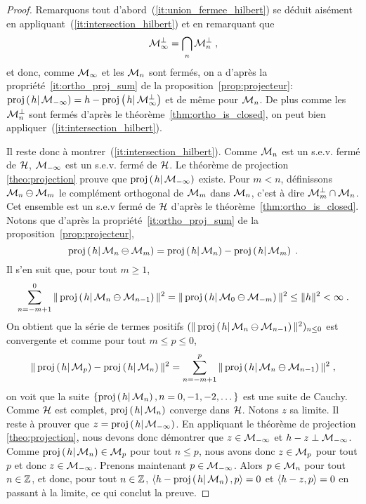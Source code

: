\begin{proof}\smartqed
Remarquons tout d'abord~(\ref{it:union_fermee_hilbert}) se d\'{e}duit ais\'{e}ment en
appliquant~(\ref{it:intersection_hilbert}) et en remarquant que
$$
\mathcal{M}_\infty^\perp= \bigcap_n \mathcal{M}_n^\perp\;,
$$
et donc, comme $\mathcal{M}_\infty$ et les $\mathcal{M}_n$ sont ferm\'{e}s, on a d'apr\`{e}s la
propri\'{e}t\'{e}~\ref{it:ortho_proj_sum} de la proposition~\ref{prop:projecteur}:
$\proj{h}{\cM_{-\infty}}=h-\proj{h}{\cM_\infty^\perp}$
et de m\^{e}me pour  $\mathcal{M}_n$. De plus comme les $\mathcal{M}_n^\perp$ sont ferm\'{e}s d'apr\`{e}s
le th\'{e}or\`{e}me~\ref{thm:ortho_is_closed}, on peut bien
appliquer~(\ref{it:intersection_hilbert}).

Il reste donc \`{a} montrer~(\ref{it:intersection_hilbert}).
Comme $\mathcal{M}_n$ est un s.e.v. ferm\'{e} de $\mathcal{H}$, $\mathcal{M}_{-\infty}$ est un s.e.v. ferm\'{e}
de $\mathcal{H}$. Le th\'{e}or\`{e}me de projection \ref{theo:projection} prouve que
$\proj{h}{\cM_{- \infty}}$ existe. Pour $m < n$, d\'{e}finissons $\mathcal{M}_n \ominus
\mathcal{M}_m$ le compl\'{e}ment orthogonal de $\mathcal{M}_m$ dans $\mathcal{M}_n$, c'est \`{a} dire
$\mathcal{M}_m^\perp\cap\mathcal{M}_n$. Cet ensemble est un s.e.v ferm\'{e} de $\mathcal{H}$ d'apr\`{e}s le
th\'{e}or\`{e}me~\ref{thm:ortho_is_closed}.  Notons que d'apr\`{e}s la
propri\'{e}t\'{e}~\ref{it:ortho_proj_sum} de la proposition~\ref{prop:projecteur},
\[
\proj{h}{\cM_n \ominusperp \cM_m} = \proj{h}{\cM_n} - \proj{h}{\cM_m} \eqsp.
\]
Il s'en suit que, pour tout $m \geq 1$,
\[
\sum_{n= -m+1}^0 \| \proj{h}{ \cM_n \ominusperp \cM_{n-1}} \|^2 = \| \proj{h}{\cM_0
  \ominusperp \cM_{-m}} \|^2 \leq \|h\|^2 < \infty\;.
\]
On obtient que la s\'{e}rie de termes positifs  $(\| \proj{h}{ \cM_n \ominusperp
  \cM_{n-1}} \|^2)_{n\leq0}$ est convergente et comme pour tout $m\leq p\leq 0$,
$$
\|\proj{h}{\cM_p}-\proj{h}{\cM_n}\|^2=
\sum_{n= -m+1}^p \| \proj{h}{ \cM_n \ominusperp \cM_{n-1}} \|^2\;,
$$
on voit que la suite $\{ \proj{h}{\cM_n}, n=0,-1,-2, \dots \}$ est une suite
de Cauchy.  Comme $\mathcal{H}$ est complet, $\proj{h}{\cM_n}$ converge dans
$\mathcal{H}$. Notons $z$ sa limite. Il
reste \`{a} prouver que $z = \proj{h}{\cM_{- \infty}}$. En appliquant le
th\'{e}or\`{e}me de projection \ref{theo:projection}, nous devons
donc d\'{e}montrer que $z \in \mathcal{M}_{- \infty}$ et $h-z \perp
\mathcal{M}_{- \infty}$. Comme $\proj{h}{\cM_n} \in \cM_p$ pour tout $n \leq p$, nous
avons donc $z \in \mathcal{M}_p$ pour
tout $p$ et donc $z \in \mathcal{M}_{-\infty}$. Prenons maintenant $p \in \mathcal{M}_{-
  \infty}$. Alors $p \in
\mathcal{M}_{n}$ pour tout $n \in \mathbb{Z}$, et donc, pour tout $n \in \mathbb{Z}$,
$\pscal{h - \proj{h}{\cM_n}}{p}= 0$ et $\left\langle h - z, p \right\rangle=0$ en passant \`{a} la
limite, ce qui conclut la preuve.

\end{proof}

